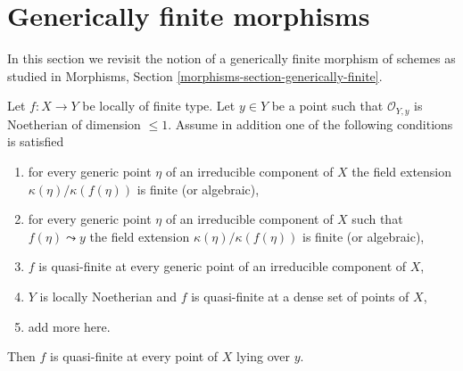 \section{Generically finite morphisms}
\label{section-generically-finite}

\noindent
In this section we revisit the notion of a generically finite
morphism of schemes as studied in
Morphisms, Section \ref{morphisms-section-generically-finite}.

\begin{lemma}
\label{lemma-quasi-finite-in-codim-1}
Let $f : X \to Y$ be locally of finite type. Let $y \in Y$ be a point
such that $\mathcal{O}_{Y, y}$ is Noetherian of dimension $\leq 1$.
Assume in addition one of the following conditions is satisfied
\begin{enumerate}
\item for every generic point $\eta$ of an irreducible component
of $X$ the field extension $\kappa(\eta)/\kappa(f(\eta))$
is finite (or algebraic),
\item for every generic point $\eta$ of an irreducible component
of $X$ such that $f(\eta) \leadsto y$ the field extension
$\kappa(\eta)/\kappa(f(\eta))$ is finite (or algebraic),
\item $f$ is quasi-finite at every generic point of an
irreducible component of $X$,
\item $Y$ is locally Noetherian and $f$
is quasi-finite at a dense set of points of $X$,
\item add more here.
\end{enumerate}
Then $f$ is quasi-finite at every point of $X$ lying over $y$.
\end{lemma}

